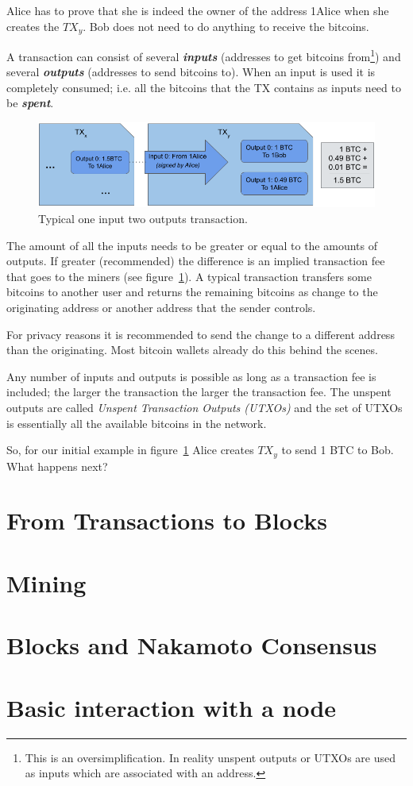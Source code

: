 Alice has to prove that she is indeed the owner of the address 1Alice when she creates the $TX_y$. Bob does not need to do anything to receive the bitcoins.

A transaction can consist of several \textbf{\emph{inputs}} (addresses to get bitcoins from\footnote{This is an oversimplification. In reality unspent outputs or UTXOs are used as inputs which are associated with an address.}) and several \textbf{\emph{outputs}} (addresses to send bitcoins to). When an input is used it is completely consumed; i.e. all the bitcoins that the TX contains as inputs need to be \textbf{\emph{spent}}.

\begin{figure}
\begin{center}
	\includegraphics[scale=0.5]{images/typical-transaction}
\caption{Typical one input two outputs transaction.}
\label{fig:typical-transaction}
\end{center}
\end{figure}

The amount of all the inputs needs to be greater or equal to the amounts of outputs. If greater (recommended) the difference is an implied transaction fee that goes to the miners (see figure~\ref{fig:typical-transaction}). A typical transaction transfers some bitcoins to another user and returns the remaining bitcoins as change to the originating address or another address that the sender controls.

\begin{remark}
For privacy reasons it is recommended to send the change to a different address than the originating. Most bitcoin wallets already do this behind the scenes.
\end{remark}

Any number of inputs and outputs is possible as long as a transaction fee is included; the larger the transaction the larger the transaction fee. The unspent outputs are called \emph{Unspent Transaction Outputs (UTXOs)} and the set of UTXOs is essentially all the available bitcoins in the network.

So, for our initial example in figure~\ref{fig:typical-transaction} Alice creates $TX_y$ to send 1 BTC to Bob. What happens next?


\section{From Transactions to Blocks}
\section{Mining}
\section{Blocks and Nakamoto Consensus}
\section{Basic interaction with a node}


